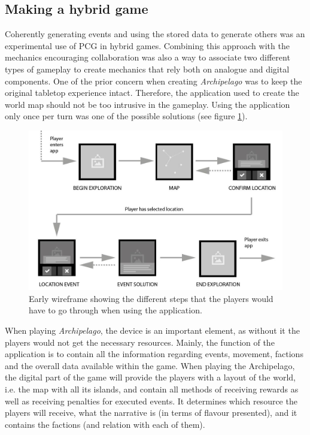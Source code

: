 \subsection{Making a hybrid game}
Coherently generating events and using the stored data to generate others was an experimental use of PCG in hybrid games. Combining this approach with the mechanics encouraging collaboration was also a way to associate two different types of gameplay to create mechanics that rely both on analogue and digital components. One of the prior concern when creating \textit{Archipelago} was to keep the original tabletop experience intact. Therefore, the application used to create the world map should not be too intrusive in the gameplay. Using the application only once per turn was one of the possible solutions (see figure \ref{fig:wireframe}).

\begin{figure}[!ht]
    \centering
    \includegraphics[width=\textwidth]{Images/wire.jpg}
    \caption{Early wireframe showing the different steps that the players would have to go through when using the application.}
    \label{fig:wireframe}
\end{figure}

When playing \textit{Archipelago}, the device is an important element, as without it the players would not get the necessary resources.
Mainly, the function of the application is to contain all the information regarding events, movement, factions and the overall data available within the game. 
When playing the Archipelago, the digital part of the game will provide the players with a layout of the world, i.e. the map with all its islands, and contain all methods of receiving rewards as well as receiving penalties for executed events. It determines which resource the players will receive, what the narrative is (in terms of flavour presented), and it contains the factions (and relation with each of them).

